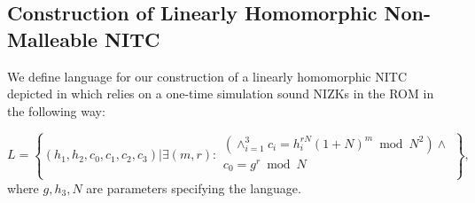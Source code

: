 \subsection{Construction of Linearly Homomorphic Non-Malleable NITC}
We define language for our construction of a linearly homomorphic NITC depicted in  which relies on a one-time simulation sound NIZKs in the ROM in the following way:

\[
L = \left\{(h_1, h_2, c_0, c_1, c_2, c_3)| \exists (m,r):
\begin{aligned}
       (\land_{i=1}^3 c_i = h_i^{rN}(1+N)^m \bmod N^2) \land \\
       c_0 = g^r \bmod N\\
    \end{aligned}
    \right\}, 
\]
where $g, h_3, N$ are parameters specifying the language.



